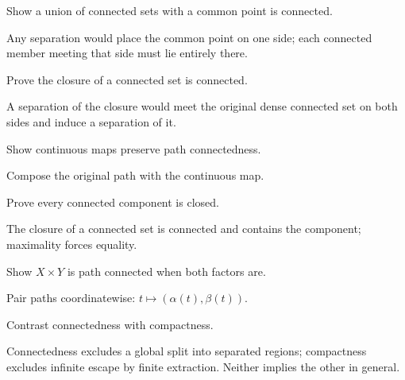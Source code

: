 \begin{problem}\label{prob:ii07-problem-07}
Show a union of connected sets with a common point is connected.
\end{problem}
\begin{solution}
Any separation would place the common point on one side; each connected member meeting that side must lie entirely there.
\end{solution}

\begin{problem}\label{prob:ii07-problem-08}
Prove the closure of a connected set is connected.
\end{problem}
\begin{solution}
A separation of the closure would meet the original dense connected set on both sides and induce a separation of it.
\end{solution}

\begin{problem}\label{prob:ii07-problem-09}
Show continuous maps preserve path connectedness.
\end{problem}
\begin{solution}
Compose the original path with the continuous map.
\end{solution}

\begin{problem}\label{prob:ii07-problem-10}
Prove every connected component is closed.
\end{problem}
\begin{solution}
The closure of a connected set is connected and contains the component; maximality forces equality.
\end{solution}

\begin{problem}\label{prob:ii07-problem-11}
Show $X\times Y$ is path connected when both factors are.
\end{problem}
\begin{solution}
Pair paths coordinatewise: $t\mapsto(\alpha(t),\beta(t))$.
\end{solution}

\begin{problem}\label{prob:ii07-problem-12}
Contrast connectedness with compactness.
\end{problem}
\begin{solution}
Connectedness excludes a global split into separated regions; compactness excludes infinite escape by finite extraction. Neither implies the other in general.
\end{solution}

